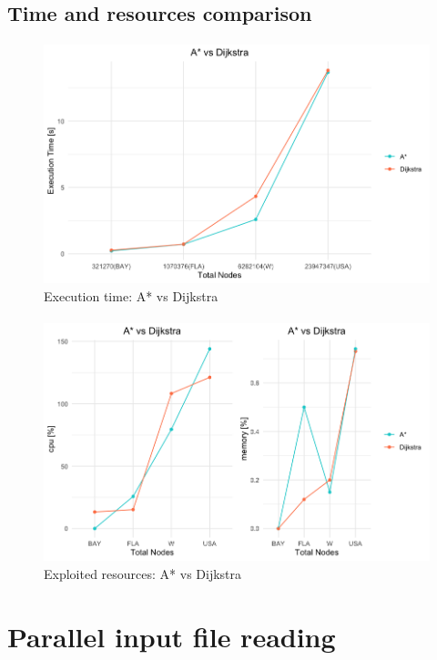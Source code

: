 \documentclass[12pt]{beamer}
\begin{document}
	\subsection{Time and resources comparison}
	\begin{frame}{\secname}
		\framesubtitle{\subsecname}
		\begin{figure}[ht!]
			\centering
			\includegraphics[width=0.8\linewidth]{astar_dijkstra/execution_time.png}
			\caption{Execution time: A* vs Dijkstra}
			\label{astardijkstratime}
		  \end{figure}
	\end{frame}
	\begin{frame}{\secname}
		\framesubtitle{\subsecname}
		\begin{figure}[ht!]
			\centering
			\includegraphics[width=0.8\linewidth]{astar_dijkstra/cpumem.png}
			\caption{Exploited resources: A* vs Dijkstra}
			\label{astardijkstracpumem}
		\end{figure}
	\end{frame}
	\section{Parallel input file reading}
\end{document}
